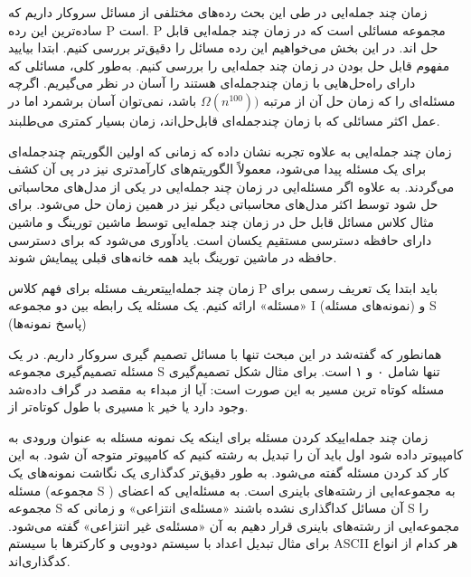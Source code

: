 \begin{itemframe}{زمان چند جمله‌ایی}
\decLineSpace
\itm
در طی این بحث رده‌های مختلفی از مسائل سروکار داریم که ساده‌ترین این رده P است. P مجموعه مسائلی است که در زمان چند جمله‌ایی قابل حل اند. در این بخش می‌خواهیم این رده مسائل را دقیق‌تر بررسی کنیم.
\itm
ابتدا بیایید مفهوم قابل حل بودن در زمان چند جمله‌ایی را بررسی کنیم. به‌طور کلی، مسائلی که دارای راه‌حل‌هایی با زمان چندجمله‌ای هستند را آسان در نظر می‌گیریم.
\itm
اگرچه مسئله‌ای را که زمان حل آن از مرتبه
$\Omega(n^{100}))$
 باشد، نمی‌توان آسان برشمرد اما در عمل اکثر مسائلی که با زمان چندجمله‌ای قابل‌حل‌اند، زمان بسیار کمتری می‌طلبند.
\end{itemframe}
\begin{itemframe}{زمان چند جمله‌ایی}
\itm
به علاوه تجربه نشان داده که زمانی که اولین الگوریتم چندجمله‌ای برای یک مسئله پیدا می‌شود، معمولاً الگوریتم‌های کارآمدتری نیز در پی آن کشف می‌گردند. به علاوه اگر مسئله‌ایی در زمان چند جمله‌ایی در یکی از مدل‌های محاسباتی حل شود توسط اکثر مدل‌های محاسباتی دیگر نیز در همین زمان حل می‌شود.
\itm
برای مثال کلاس مسائل قابل حل در زمان چند جمله‌ایی توسط ماشین تورینگ و ماشین دارای حافظه دسترسی مستقیم یکسان است.
‌یادآوری می‌شود که برای دسترسی حافظه در ماشین تورینگ باید همه خانه‌های قبلی پیمایش شوند.

\end{itemframe}

\begin{itemframe-s}{زمان چند جمله‌ایی}{تعریف مسئله}
\itm
برای فهم کلاس P باید ابتدا یک تعریف رسمی برای «مسئله» ارائه کنیم.
\itm
یک مسئله یک رابطه بین دو مجموعه I (نمونه‌های مسئله) و S (پاسخ نمونه‌ها)

همانطور که گفته‌شد در این مبحث تنها با مسائل تصمیم گیری سروکار داریم.
در یک مسئله تصمیم‌گیری مجموعه S تنها شامل ۰ و ۱ است.
\itm
برای مثال شکل تصمیم‌گیری مسئله کوتاه ترین مسیر به این صورت است:
آیا از مبداء به مقصد در گراف داده‌شد مسیری با طول کوتاه‌تر از k وجود دارد یا خیر.

\end{itemframe-s}
\begin{itemframe-s}{زمان چند جمله‌ایی}{کد کردن مسئله}
\itm
برای اینکه یک نمونه مسئله به عنوان ورودی به کامپیوتر داده شود اول باید آن را تبدیل به رشته کنیم که کامپیوتر متوجه آن شود.
\itm
به این کار کد کردن
مسئله گفته می‌شود. به طور دقیق‌تر کدگذاری یک نگاشت نمونه‌های یک مسئله
 (مجموعه S )
به مجموعه‌ایی از رشته‌های باینری است.
\itm
به مسئله‌ایی که اعضای مجموعه S آن مسائل کداگذاری نشده باشند «مسئله‌ی انتزاعی»
و زمانی که S را مجموعه‌ایی از رشته‌های باینری قرار دهیم به آن «مسئله‌ی غیر انتزاعی»
گفته می‌شود.
\itm
برای مثال تبدیل اعداد با سیستم دودویی و کارکترها با سیستم ASCII هر کدام از انواع کدگذاری‌اند.
\end{itemframe-s}

